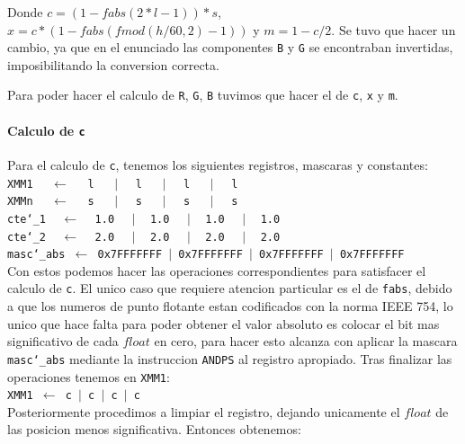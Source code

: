 Donde $c = (1 - fabs(2*l - 1))*s$, $x = c*(1 - fabs(fmod(h/60, 2) - 1))$ y $m = 1 - c/2$. Se tuvo que hacer un cambio, ya que en el enunciado las componentes \texttt{B} y \texttt{G} se encontraban invertidas, imposibilitando la conversion correcta.

Para poder hacer el calculo de \texttt{R}, \texttt{G}, \texttt{B} tuvimos que hacer el de \texttt{c}, \texttt{x} y \texttt{m}.

\paragraph{Calculo de \texttt{c}\newline}

Para el calculo de \texttt{c}, tenemos los siguientes registros, mascaras y constantes:\\

\noindent
\texttt{XMM1 $\ \ \ \ \gets \ \ \ \ $ l $\ \ \ \ \ \vert\ \ \ \ $ l $\ \ \ \ \ \vert\ \ \ \ $ l  $\ \ \ \ \ \vert\ \ \ \ $ l}\\
\texttt{XMMn $\ \ \ \ \gets \ \ \ \ $ s $\ \ \ \ \ \vert\ \ \ \ $ s $\ \ \ \ \ \vert\ \ \ \ $ s  $\ \ \ \ \ \vert\ \ \ \ $ s}\\
\texttt{cte\char`_1 $\ \ \ \gets\ \ \ $ 1.0 $\ \ \ \ \vert\ \ \ $ 1.0 $\ \ \ \ \vert\ \ \ $ 1.0 $\ \ \ \ \vert\ \ \ $ 1.0}\\
\texttt{cte\char`_2 $\ \ \ \gets\ \ \ $ 2.0 $\ \ \ \ \vert\ \ \ $ 2.0 $\ \ \ \ \vert\ \ \ $ 2.0 $\ \ \ \ \vert \ \ \ $ 2.0}\\
\texttt{masc\char`_abs $\gets$ 0x7FFFFFFF $\vert$ 0x7FFFFFFF $\vert$ 0x7FFFFFFF $\vert$ 0x7FFFFFFF}\\

Con estos podemos hacer las operaciones correspondientes para satisfacer el calculo de \texttt{c}. El unico caso que requiere atencion particular es el de \texttt{fabs}, debido a que los numeros de punto flotante estan codificados con la norma IEEE 754, lo unico que hace falta para poder obtener el valor absoluto es colocar el bit mas significativo de cada $float$ en cero, para hacer esto alcanza con aplicar la mascara \texttt{masc\char`_abs} mediante la instruccion \texttt{ANDPS} al registro apropiado. Tras finalizar las operaciones tenemos en \texttt{XMM1}:\\

\noindent
\texttt{XMM1 $\gets$ c $\vert$ c $\vert$ c $\vert$ c}\\

Posteriormente procedimos a limpiar el registro, dejando unicamente el $float$ de las posicion menos significativa. Entonces obtenemos:\\

